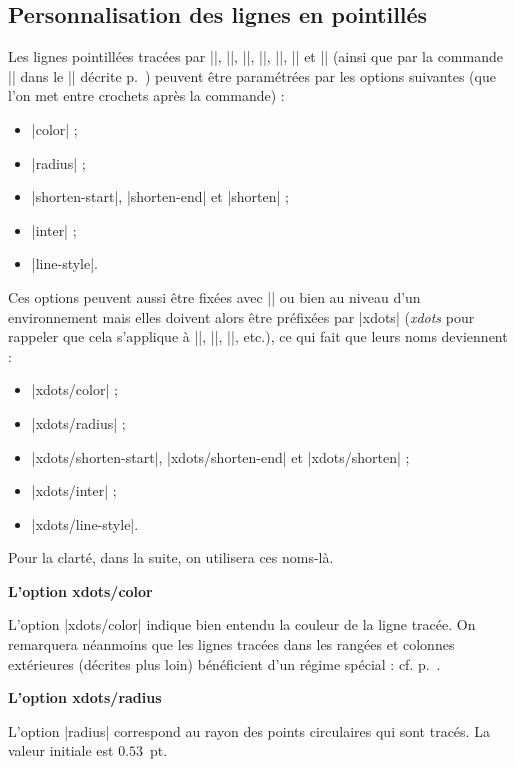 \documentclass[dvipsnames]{article}%
\begin{document}
\subsection{Personnalisation des lignes en pointillés}


\label{customization}
Les lignes pointillées tracées par |\Ldots|, |\Cdots|, |\Vdots|, |\Ddots|,
|\Iddots|, |\Hdotsfor| et |\Vdotsfor| (ainsi que par la commande |\line| dans le
|\CodeAfter| décrite p.~\pageref{line-in-code-after}) peuvent être paramétrées
par les options suivantes (que l'on met entre crochets après la commande) :
%
\begin{itemize}
\item |color| ;
\item |radius| ; 
\item |shorten-start|, |shorten-end| et |shorten| ;
\item |inter| ;
\item |line-style|.
\end{itemize}

Ces options peuvent aussi être fixées avec |\NiceMatrixOptions| ou bien au
niveau d'un environnement mais elles doivent alors être préfixées par |xdots|
(\textsl{xdots} pour rappeler que cela s'applique à |\Cdots|, |\Ldots|,
|\Vdots|, etc.), ce qui fait que leurs noms deviennent :
%
\begin{itemize}
\item |xdots/color| ;
\item |xdots/radius| ;
\item |xdots/shorten-start|, |xdots/shorten-end| et |xdots/shorten| ;
\item |xdots/inter| ; 
\item |xdots/line-style|.
\end{itemize}
%
Pour la clarté, dans la suite, on utilisera ces noms-là.

\medskip
\textbf{L'option xdots/color}\par\nobreak

\smallskip
L'option |xdots/color| indique bien entendu la couleur de la ligne tracée. On
remarquera néanmoins que les lignes tracées dans les rangées et colonnes
extérieures (décrites plus loin) bénéficient d'un régime spécial : cf.
p.~\pageref{exterior}.

\medskip
\textbf{L'option xdots/radius}\par\nobreak

\smallskip
L'option |radius| correspond au rayon des points circulaires qui sont tracés. La
valeur initiale est $0.53$~pt.
\end{document}
